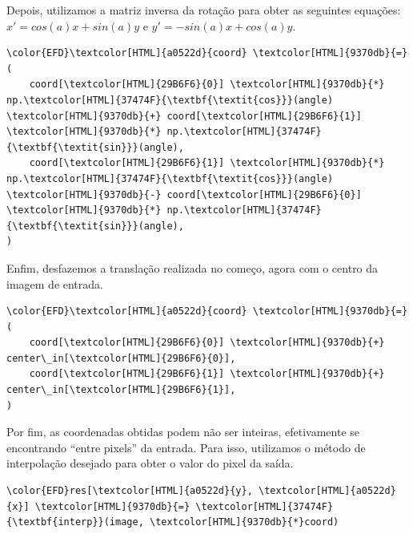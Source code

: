 \documentclass[11pt]{article}
\begin{document}
Depois, utilizamos a matriz inversa da rotação para obter as seguintes equações: \(x' = cos(a)x + sin(a)y\) e \(y' = - sin(a)x + cos(a)y\).
\begin{Code}
\begin{Verbatim}
\color{EFD}\textcolor[HTML]{a0522d}{coord} \textcolor[HTML]{9370db}{=} (
    coord[\textcolor[HTML]{29B6F6}{0}] \textcolor[HTML]{9370db}{*} np.\textcolor[HTML]{37474F}{\textbf{\textit{cos}}}(angle) \textcolor[HTML]{9370db}{+} coord[\textcolor[HTML]{29B6F6}{1}] \textcolor[HTML]{9370db}{*} np.\textcolor[HTML]{37474F}{\textbf{\textit{sin}}}(angle),
    coord[\textcolor[HTML]{29B6F6}{1}] \textcolor[HTML]{9370db}{*} np.\textcolor[HTML]{37474F}{\textbf{\textit{cos}}}(angle) \textcolor[HTML]{9370db}{-} coord[\textcolor[HTML]{29B6F6}{0}] \textcolor[HTML]{9370db}{*} np.\textcolor[HTML]{37474F}{\textbf{\textit{sin}}}(angle),
)
\end{Verbatim}
\end{Code}

Enfim, desfazemos a translação realizada no começo, agora com o centro da imagem de entrada.
\begin{Code}
\begin{Verbatim}
\color{EFD}\textcolor[HTML]{a0522d}{coord} \textcolor[HTML]{9370db}{=} (
    coord[\textcolor[HTML]{29B6F6}{0}] \textcolor[HTML]{9370db}{+} center\_in[\textcolor[HTML]{29B6F6}{0}],
    coord[\textcolor[HTML]{29B6F6}{1}] \textcolor[HTML]{9370db}{+} center\_in[\textcolor[HTML]{29B6F6}{1}],
)
\end{Verbatim}
\end{Code}

Por fim, as coordenadas obtidas podem não ser inteiras, efetivamente se encontrando ``entre pixels'' da entrada.
Para isso, utilizamos o método de interpolação desejado para obter o valor do pixel da saída.
\begin{Code}
\begin{Verbatim}
\color{EFD}res[\textcolor[HTML]{a0522d}{y}, \textcolor[HTML]{a0522d}{x}] \textcolor[HTML]{9370db}{=} \textcolor[HTML]{37474F}{\textbf{interp}}(image, \textcolor[HTML]{9370db}{*}coord)
\end{Verbatim}
\end{Code}
\end{document}
